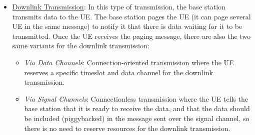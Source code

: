 \begin{itemize}
\begin{itemize}
            \item \emph{Via Signal Channels}: This is a connectionless transmission. In the first step, when the UE asks the base station for resources for uplink transmission, the actual data that the UE wants to transmit is included in the request (called piggybacking), so there is no need to establish a connection and reserve resources for the transmission. The base station can then transmit the data to the core network immediately after receiving the request from the UE, without the need to wait for the UE to transmit its data using the reserved resources. This is useful for small transmissions, as it allows for a more efficient use of the resources and reduces the overhead associated with establishing a connection and reserving resources for the transmission.
        \end{itemize}
        \item \ul{Downlink Transmission}: In this type of transmission, the base station transmits data to the UE. The base station pages the UE (it can page several UE in the same message) to notify it that there is data waiting for it to be transmitted. Once the UE receives the paging message, there are also the two same variants for the downlink transmission:
        \begin{itemize}
            \item \emph{Via Data Channels}: Connection-oriented transmission where the UE reserves a specific timeslot and data channel for the downlink transmission.
            \item \emph{Via Signal Channels}: Connectionless transmission where the UE tells the base station that it is ready to receive the data, and that the data should be included (piggybacked) in the message sent over the signal channel, so there is no need to reserve resources for the downlink transmission.
        \end{itemize}
    \end{itemize}

